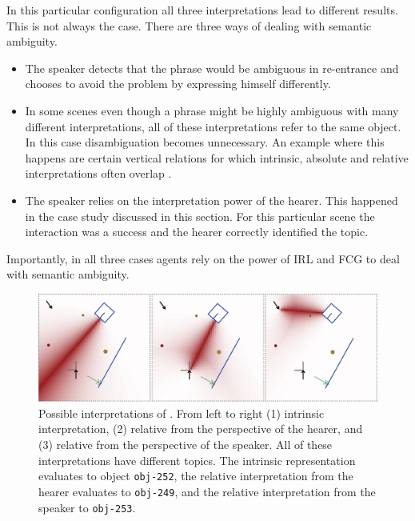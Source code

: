 In this particular configuration all three interpretations lead 
to different results. This is not always the case. There are three 
ways of dealing with semantic ambiguity.
\begin{itemize}
\item The speaker detects that the phrase would be ambiguous in re-entrance and 
chooses to avoid the problem by expressing himself differently.
\item  In some scenes even though a phrase might be highly ambiguous with 
many different interpretations, all of these interpretations refer to the same object.
In this case disambiguation becomes unnecessary. An example where this happens
are certain vertical relations for which intrinsic, absolute and 
relative interpretations often overlap
\citep{carlson1999selecting}.
\item The speaker relies on the interpretation power of the hearer. This happened in
the case study discussed in this section. For this particular scene the interaction was
a success and the hearer correctly identified the topic.
\end{itemize}
Importantly, in all three cases agents rely on the power of IRL and FCG 
to deal with semantic ambiguity.

\begin{figure}
\begin{center}
\includegraphics[width=0.95\columnwidth]{figs/semantic-ambiguity-interpretations.png}
\end{center}
\caption[Interpretation example graphic]{Possible interpretations of .
From left to right (1) intrinsic interpretation, (2) relative from the perspective of the hearer,
and (3) relative from the perspective of the speaker. All of these interpretations have
different topics. The intrinsic representation evaluates to object {\footnotesize\tt obj-252},
the relative interpretation from the hearer evaluates to {\footnotesize\tt obj-249}, and
the relative interpretation from the speaker to {\footnotesize\tt obj-253}.}
\label{f:interpretations}
\end{figure}


